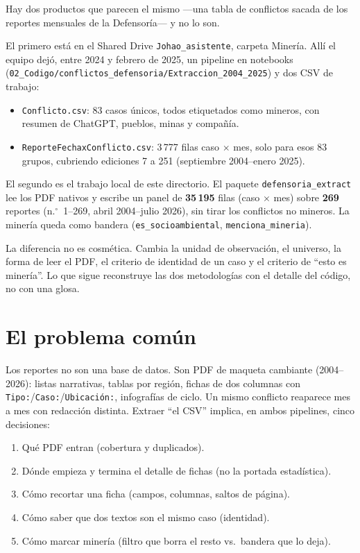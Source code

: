 \documentclass[11pt,a4paper]{article}
\begin{document}
Hay dos productos que parecen el mismo ---una tabla de conflictos sacada de los reportes mensuales de la Defensoría--- y no lo son.

El primero está en el Shared Drive \texttt{Johao\_asistente}, carpeta Minería. Allí el equipo dejó, entre 2024 y febrero de 2025, un pipeline en notebooks (\texttt{02\_Codigo/conflictos\_defensoria/Extraccion\_2004\_2025}) y dos CSV de trabajo:

\begin{itemize}
  \item \texttt{Conflicto.csv}: 83 casos únicos, todos etiquetados como mineros, con resumen de ChatGPT, pueblos, minas y compañía.
  \item \texttt{ReporteFechaxConflicto.csv}: 3\,777 filas caso $\times$ mes, solo para esos 83 grupos, cubriendo ediciones 7 a 251 (septiembre 2004--enero 2025).
\end{itemize}

El segundo es el trabajo local de este directorio. El paquete \texttt{defensoria\_extract} lee los PDF nativos y escribe un panel de \textbf{35\,195} filas (caso $\times$ mes) sobre \textbf{269} reportes (n.$^\circ$~1--269, abril 2004--julio 2026), sin tirar los conflictos no mineros. La minería queda como bandera (\texttt{es\_socioambiental}, \texttt{menciona\_mineria}).

La diferencia no es cosmética. Cambia la unidad de observación, el universo, la forma de leer el PDF, el criterio de identidad de un caso y el criterio de ``esto es minería''. Lo que sigue reconstruye las dos metodologías con el detalle del código, no con una glosa.

\section{El problema común}

Los reportes no son una base de datos. Son PDF de maqueta cambiante (2004--2026): listas narrativas, tablas por región, fichas de dos columnas con \texttt{Tipo:}/\texttt{Caso:}/\texttt{Ubicación:}, infografías de ciclo. Un mismo conflicto reaparece mes a mes con redacción distinta. Extraer ``el CSV'' implica, en ambos pipelines, cinco decisiones:

\begin{enumerate}
  \item Qué PDF entran (cobertura y duplicados).
  \item Dónde empieza y termina el detalle de fichas (no la portada estadística).
  \item Cómo recortar una ficha (campos, columnas, saltos de página).
  \item Cómo saber que dos textos son el mismo caso (identidad).
  \item Cómo marcar minería (filtro que borra el resto vs.\ bandera que lo deja).
\end{enumerate}
\end{document}
